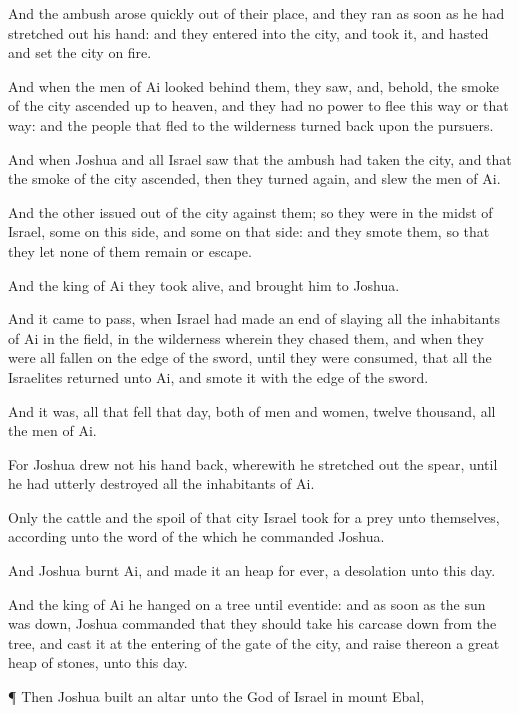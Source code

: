 {And the
ambush
arose
quickly out of their
place, and they
ran as soon as he had stretched
out his
hand: and they
entered into the
city, and
took it, and
hasted and
set the
city on
fire.

And when the
men of
Ai
looked
behind them, they
saw, and, behold, the
smoke of the
city ascended
up to
heaven, and they had no
power to
flee this way or that
way: and the
people that
fled to the
wilderness turned
back upon the
pursuers.

And when
Joshua and all
Israel
saw that the
ambush had
taken the
city, and that the
smoke of the
city
ascended, then they turned
again, and
slew the
men of
Ai.

And the
other issued
out of the
city
against them; so they were in the
midst of
Israel, some on this side, and some on that side: and they
smote them, so
that they
let none of them
remain or
escape.


\par }{\PP {}And the
king of
Ai they
took
alive, and
brought him to
Joshua.

And it came to pass, when
Israel had made an
end of
slaying all the
inhabitants of
Ai in the
field, in the
wilderness wherein they
chased them, and when they were all
fallen on the
edge of the
sword, until they were
consumed, that all the
Israelites
returned unto
Ai, and
smote it with the
edge of the
sword.

And
{} it was,
{} all that
fell that
day, both of
men and
women,
{}
twelve
thousand,
{} all the
men of
Ai.

For
Joshua
drew not his
hand
back, wherewith he stretched
out the
spear, until he had utterly
destroyed all the
inhabitants of
Ai.

Only the
cattle and the
spoil of that
city
Israel took for a
prey unto themselves, according unto the
word of the
{} which he
commanded
Joshua.

And
Joshua
burnt
Ai, and
made it an
heap for
ever,
{} a
desolation unto this
day.

And the
king of
Ai he
hanged on a
tree until
eventide: and as soon as the
sun was
down,
Joshua
commanded that they should
take his
carcase
down from the
tree, and
cast it at the
entering of the
gate of the
city, and
raise thereon a
great
heap of
stones,
{} unto this
day.


\par }{\PP {}¶ Then
Joshua
built an
altar unto the
{}
God of
Israel in
mount
Ebal,

}
